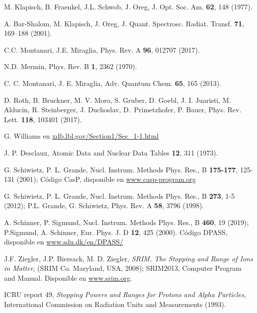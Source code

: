 \begin{thebibliography}{9}

M. Klapisch, B. Fraenkel, J.L. Schwob, J. Oreg,
J. Opt. Soc. Am. \textbf{62}, 148 (1977).

A. Bar-Shalom, M. Klapisch, J. Oreg,
J. Quant. Spectrosc. Radiat. Transf. \textbf{71}, 169--188 (2001).

C.C. Montanari, J.E. Miraglia, 
Phys. Rev. A \textbf{96}, 012707 (2017).

N.D. Mermin, 
Phys. Rev. B \textbf{1}, 2362 (1970).

C. C. Montanari, J. E. Miraglia,
Adv. Quantum Chem. \textbf{65}, 165 (2013).

D. Roth, B. Bruckner, M. V. Moro, S. Gruber, D. Goebl, J. I. Juaristi,
M. Alducin, R. Steinberger, J. Duchoslav, \mbox{D. Primetzhofer}, P. Bauer,
Phys. Rev. Lett. \textbf{118}, 103401 (2017).

G. Williams en 
\href{http://xdb.lbl.gov/Section1/Sec\_1-1.html}{xdb.lbl.gov/Section1/Sec\_1-1.html}

J. P. Desclaux,
Atomic Data and Nuclear Data Tables \textbf{12}, 311 (1973).

G. Schiwietz, P. L. Grande, 
Nucl. Instrum. Methods Phys. Res., B \textbf{175-177}, 125-131 (2001); 
Código CasP, disponible en \href{https://www.casp-program.org}{www.casp-program.org}

G. Schiwietz, P. L. Grande,
Nucl. Instrum. Methods Phys. Res., B \textbf{273}, 1-5 (2012); 
P.L. Grande, G. Schiwietz, 
Phys. Rev. A \textbf{58}, 3796 (1998).

A. Schinner, P. Sigmund, 
Nucl. Instrum. Methods Phys. Res., B \textbf{460}, 19 (2019); 
P.Sigmund, A. Schinner, 
Eur. Phys. J. D \textbf{12}, 425 (2000). 
Código DPASS, disponible en \href{https://www.sdu.dk/en/DPASS/}{www.sdu.dk/en/DPASS/}

J.F. Ziegler, J.P. Biersack, M. D. Ziegler, 
\textit{SRIM, The Stopping and Range of Ions in Matter}, 
(SRIM Co. Maryland, USA, 2008); 
SRIM2013, Computer Program and Manual. Disponible en \href{https://www.srim.org}{www.srim.org}.

ICRU report 49, \textit{Stopping Powers and Ranges for Protons and Alpha Particles},
International Commission on Radiation Units and Measurements (1993).


\end{thebibliography}
